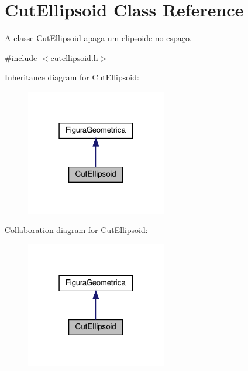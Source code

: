 \hypertarget{class_cut_ellipsoid}{}\section{Cut\+Ellipsoid Class Reference}
\label{class_cut_ellipsoid}


A classe \hyperlink{class_cut_ellipsoid}{Cut\+Ellipsoid} apaga um elipsoide no espaço.  




{\ttfamily \#include $<$cutellipsoid.\+h$>$}



Inheritance diagram for Cut\+Ellipsoid\+:
\nopagebreak
\begin{figure}[H]
\begin{center}
\leavevmode
\includegraphics[width=174pt]{class_cut_ellipsoid__inherit__graph}
\end{center}
\end{figure}


Collaboration diagram for Cut\+Ellipsoid\+:
\nopagebreak
\begin{figure}[H]
\begin{center}
\leavevmode
\includegraphics[width=174pt]{class_cut_ellipsoid__coll__graph}
\end{center}
\end{figure}
